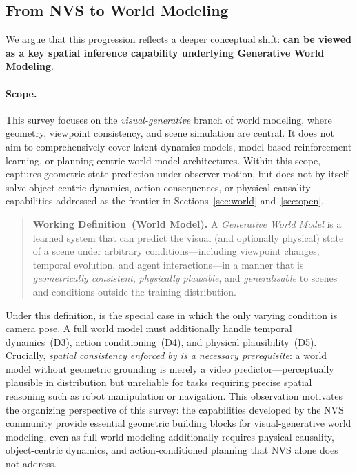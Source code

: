 \subsection{From NVS to World Modeling}

We argue that this progression reflects a deeper conceptual shift:
\textbf{\nvs{} can be viewed as a key spatial inference capability underlying
Generative World Modeling}.

\paragraph{Scope.}
This survey focuses on the \emph{visual-generative} branch of world modeling, where geometry, viewpoint consistency, and scene simulation are central. It does not aim to comprehensively cover latent dynamics models, model-based reinforcement learning, or planning-centric world model architectures. Within this scope, \nvs{} captures geometric state prediction under observer motion, but does not by itself solve object-centric dynamics, action consequences, or physical causality---capabilities addressed as the frontier in Sections~\ref{sec:world} and~\ref{sec:open}.

\begin{quote}
  \textbf{Working Definition~(World Model).}\quad
  A \emph{Generative World Model} is a learned system that can predict the
  visual (and optionally physical) state of a scene under arbitrary
  conditions---including viewpoint changes, temporal evolution, and agent
  interactions---in a manner that is \emph{geometrically consistent},
  \emph{physically plausible}, and \emph{generalisable} to scenes and conditions
  outside the training distribution.
\end{quote}

Under this definition, \nvs{} is the special case in which the only varying
condition is camera pose.
A full world model must additionally handle temporal dynamics~(D3),
action conditioning~(D4), and physical plausibility~(D5).
Crucially, \emph{spatial consistency enforced by \nvs{} is a necessary
prerequisite}: a world model without geometric grounding is merely a video
predictor---perceptually plausible in distribution but unreliable for tasks
requiring precise spatial reasoning such as robot manipulation or navigation.
This observation motivates the organizing perspective of this survey: the capabilities developed by
the NVS community provide essential geometric building blocks for visual-generative world modeling,
even as full world modeling additionally requires physical causality, object-centric dynamics, and
action-conditioned planning that NVS alone does not address.

